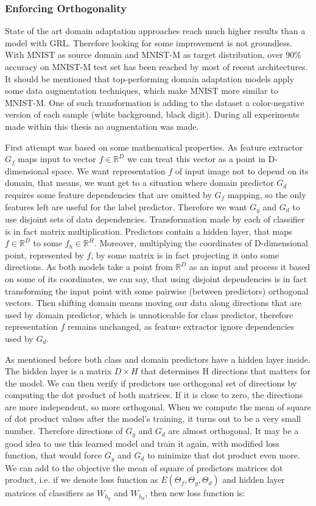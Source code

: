 \documentclass{article}
\begin{document}
\subsubsection{Enforcing Orthogonality}
State of the art domain adaptation approaches reach much higher results than a model with GRL. Therefore looking for some improvement is not groundless. With MNIST as source domain and MNIST-M as target distribution, over 90\% accuracy on MNIST-M test set has been reached by most of recent architectures. It should be mentioned that top-performing domain adaptation models apply some data augmentation techniques, which make MNIST more similar to MNIST-M. One of such transformation is adding to the dataset a color-negative version of each sample (white background, black digit). During all experiments made within this thesis no augmentation was made.
\par
First attempt was based on some mathematical properties. As feature extractor $G_{f}$ maps input to vector $f \in \mathbb{R}^{D}$ we can treat this vector as a point in D-dimensional space. We want representation $f$ of input image not to depend on its domain, that means, we want get to a situation where domain predictor $G_{d}$ requires some feature dependencies that are omitted by $G_{f}$ mapping, so the only features left are useful for the label predictor. Therefore we want $G_{y}$ and $G_{d}$ to use disjoint sets of data dependencies. Transformation made by each of classifier is in fact matrix multiplication. Predictors contain a hidden layer, that maps $f \in \mathbb{R}^{D}$ to some $f_{h} \in \mathbb{R}^{H}$. Moreover, multiplying the coordinates of D-dimensional point, represented by $f$, by some matrix is in fact projecting it onto some directions.  As both models take a point from $\mathbb{R}^{D}$ as an input and process it based on some of its coordinates, we can say, that using disjoint dependencies is in fact transforming the input point with some pairwise (between predictors) orthogonal vectors. Then shifting domain means moving our data along directions that are used by domain predictor, which is unnoticeable for class predictor, therefore representation $f$ remains unchanged, as feature extractor ignore dependencies used by $G_{d}$.
\par
As mentioned before both class and domain predictors have a hidden layer inside. The hidden layer is a matrix $D \times H$ that determines H directions that matters for the model. We can then verify if predictors use orthogonal set of directions by computing the dot product of both matrices. If it is close to zero, the directions are more independent, so more orthogonal. When we compute the mean of square of dot product values after the model's training, it turns out to be a very small number. Therefore directions of $G_{y}$ and $G_{d}$ are almost orthogonal. It may be a good idea to use this learned model and train it again, with modified loss function, that would force $G_{y}$ and $G_{d}$ to minimize that dot product even more. We can add to the objective the mean of square of predictors matrices dot product, i.e. if we denote loss function as $E(\Theta_{f}, \Theta_{y}, \Theta_{d})$ and hidden layer matrices of classifiers as $W_{h_{y}}$ and $W_{h_{d}}$, then new loss function is:
\end{document}
